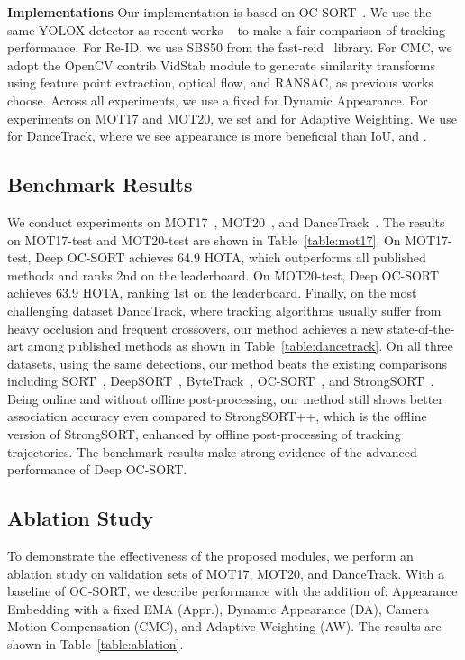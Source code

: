 \documentclass{article}
\begin{document}
\noindent \textbf{Implementations}
Our implementation is based on OC-SORT~\cite{cao2022observation,mmtrack2020}. We use the same YOLOX detector as recent works ~\cite{strongsort, botsort, cao2022track, bytetrack} to make a fair comparison of tracking performance. For Re-ID, we use SBS50 from the fast-reid~\cite{he2020fastreid} library. For CMC, we adopt the OpenCV contrib VidStab module to generate similarity transforms using feature point extraction, optical flow, and RANSAC, as previous works~\cite{botsort} choose. Across all experiments, we use a fixed  for Dynamic Appearance. For experiments on MOT17 and MOT20, we set  and  for Adaptive Weighting. 
We use  for DanceTrack, where we see appearance is more beneficial than IoU, and . 

\subsection{Benchmark Results}
\vspace{-0.2cm}
We conduct experiments on MOT17~\cite{milan2016mot16}, MOT20~\cite{dendorfer2020mot20}, and DanceTrack~\cite{sun2021dancetrack}. 
The results on MOT17-test and MOT20-test are shown in Table~\ref{table:mot17}. On MOT17-test, Deep OC-SORT achieves 64.9 HOTA, which outperforms all published methods and ranks 2nd on the leaderboard. 
On MOT20-test, Deep OC-SORT achieves 63.9 HOTA, ranking 1st on the leaderboard. Finally, on the most challenging dataset DanceTrack, where tracking algorithms usually suffer from heavy occlusion and frequent crossovers, our method achieves a new state-of-the-art among published methods as shown in Table~\ref{table:dancetrack}. 
On all three datasets, using the same detections, our method beats the existing comparisons including SORT~\cite{bewley2016simple}, DeepSORT~\cite{deepsort}, ByteTrack~\cite{bytetrack}, OC-SORT~\cite{cao2022observation}, and StrongSORT~\cite{strongsort}. 
Being online and without offline post-processing, our method still shows better association accuracy even compared to StrongSORT++, which is the offline version of StrongSORT, enhanced by offline post-processing of tracking trajectories. 
The benchmark results make strong evidence of the advanced performance of Deep OC-SORT.

\subsection{Ablation Study}
\vspace{-0.2cm}
To demonstrate the effectiveness of the proposed modules, we perform an ablation study on validation sets of MOT17, MOT20, and DanceTrack. With a baseline of OC-SORT, we describe performance with the addition of: Appearance Embedding with a fixed EMA (Appr.), Dynamic Appearance (DA), Camera Motion Compensation (CMC), and Adaptive Weighting (AW). The results are shown in Table~\ref{table:ablation}. 
\end{document}

